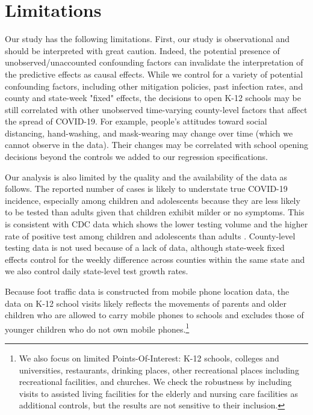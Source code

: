 \documentclass[9pt,twocolumn,twoside,lineno]{pnas-new}
\begin{document}
\section*{Limitations}
Our study has the following limitations.  First, our study is observational and should be interpreted with great caution. Indeed, the potential presence of unobserved/unaccounted confounding factors can invalidate the interpretation of the predictive effects as causal effects.  While we control for a variety of potential confounding factors, including other mitigation policies, past infection rates, and county and state-week "fixed" effects,  the decisions to open K-12 schools may be still correlated with other unobserved time-varying county-level factors that affect the spread of COVID-19. For example, people's attitudes toward social distancing, hand-washing, and mask-wearing may change over time (which we cannot observe in the data). Their changes may be correlated with school opening decisions beyond the controls we added to our regression specifications.  

Our analysis is also limited by the quality and the availability of the data as follows. The reported number of cases is likely to understate true COVID-19 incidence, especially among children and adolescents because they are less likely to be tested than adults given that children exhibit milder or no  symptoms. This is consistent with CDC data which shows the lower testing volume and the higher rate of positive test among children and adolescents than adults \citep{Leidman2021}.  County-level testing data is not used because of a lack of data, although state-week fixed effects control for the weekly difference across counties within the same state and we also control daily state-level test growth rates.

Because foot traffic data is constructed from mobile phone location data, the data on K-12 school visits likely reflects the movements of parents and older children who are allowed to carry mobile phones to schools and excludes those of younger children who do not own mobile phones.\footnote{We also focus on limited Points-Of-Interest: K-12 schools, colleges and universities, restaurants, drinking places, other recreational places including recreational facilities, and churches. We check the robustness by including visits to assisted living facilities for the elderly and nursing care facilities as additional controls, but the results are not sensitive to their inclusion.}
\end{document}
